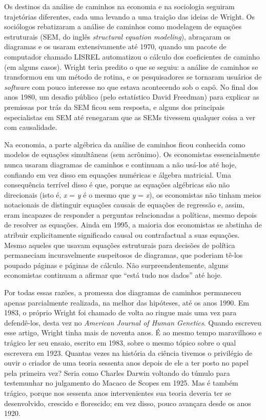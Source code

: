 \documentclass[11pt,a5paper,twoside]{book}
\begin{document}
Os destinos da análise de caminhos na economia e na sociologia seguiram trajetórias diferentes, cada uma levando a uma traição das ideias de Wright. Os sociólogos rebatizaram a análise de caminhos como modelagem de equações estruturais (SEM, do inglês \textit{structural equation modeling}), abraçaram os diagramas e os usaram extensivamente até 1970, quando um pacote de computador chamado LISREL automatizou o cálculo dos coeficientes de caminho (em alguns casos). Wright teria predito o que se seguiu: a análise de caminhos se transformou em um método de rotina, e os pesquisadores se tornaram usuários de \textit{software} com pouco interesse no que estava acontecendo sob o capô. No final dos anos 1980, um desafio público (pelo estatístico David Freedman) para explicar as premissas por trás da SEM ficou sem resposta, e alguns dos principais especialistas em SEM até renegaram que as SEMs tivessem qualquer coisa a ver com causalidade.

Na economia, a parte algébrica da análise de caminhos ficou conhecida como modelos de equações simultâneas (sem acrônimo). Os economistas essencialmente nunca usaram diagramas de caminhos e continuam a não usá-los até hoje, confiando em vez disso em equações numéricas e álgebra matricial. Uma consequência terrível disso é que, porque as equações algébricas são não direcionais (isto é, \textit{x} = \textit{y} é o mesmo que \textit{y} = \textit{x}), os economistas não tinham meios notacionais de distinguir equações causais de equações de regressão e, assim, eram incapazes de responder a perguntas relacionadas a políticas, mesmo depois de resolver as equações. Ainda em 1995, a maioria dos economistas se abstinha de atribuir explicitamente significado causal ou contrafactual a suas equações. Mesmo aqueles que usavam equações estruturais para decisões de política permaneciam incuravelmente suspeitosos de diagramas, que poderiam tê-los poupado páginas e páginas de cálculo. Não surpreendentemente, alguns economistas continuam a afirmar que “está tudo nos dados” até hoje.

Por todas essas razões, a promessa dos diagramas de caminhos permaneceu apenas parcialmente realizada, na melhor das hipóteses, até os anos 1990. Em 1983, o próprio Wright foi chamado de volta ao ringue mais uma vez para defendê-los, desta vez no \textit{American Journal of Human Genetics}. Quando escreveu esse artigo, Wright tinha mais de noventa anos. É ao mesmo tempo maravilhoso e trágico ler seu ensaio, escrito em 1983, sobre o mesmo tópico sobre o qual escrevera em 1923. Quantas vezes na história da ciência tivemos o privilégio de ouvir o criador de uma teoria sessenta anos depois de ele a ter posto no papel pela primeira vez? Seria como Charles Darwin voltando do túmulo para testemunhar no julgamento do Macaco de Scopes em 1925. Mas é também trágico, porque nos sessenta anos intervenientes sua teoria deveria ter se desenvolvido, crescido e florescido; em vez disso, pouco avançara desde os anos 1920.
\end{document}
